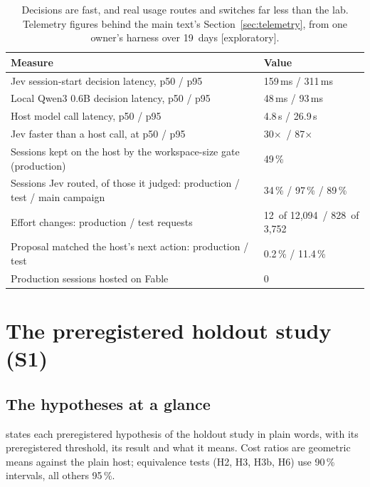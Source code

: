 \documentclass[11pt,letterpaper]{article}
\newcommand{\expl}{\mbox{\textsf{\small\color{okgray}[exploratory]}}}
\newcommand{\X}{\ensuremath{\times}}
\newcommand{\AoFableJevRoute}{89}
\newcommand{\ObDays}{19}
\newcommand{\ObEffReqProd}{12{,}094}
\newcommand{\ObEffReqTest}{3{,}752}
\newcommand{\ObEffSwitchProd}{12}
\newcommand{\ObEffSwitchTest}{828}
\newcommand{\ObFableProdSessions}{0}
\newcommand{\ObHostPfifty}{4.8}
\newcommand{\ObHostPninetyfive}{26.9}
\newcommand{\ObJevHostXFifty}{30}
\newcommand{\ObJevHostXNinetyfive}{87}
\newcommand{\ObJevPfifty}{159}
\newcommand{\ObJevPninetyfive}{311}
\newcommand{\ObJevRouteProd}{34}
\newcommand{\ObJevRouteTest}{97}
\newcommand{\ObProdRate}{0.2}
\newcommand{\ObQwenPfifty}{48}
\newcommand{\ObQwenPninetyfive}{93}
\newcommand{\ObStScopePct}{49}
\newcommand{\ObTestRate}{11.4}
\newcommand{\mainpaper}{the main text}\newcommand{\thissupp}{these appendices}\newcommand{\Thissupp}{These appendices}
\begin{document}
\begin{table}[tbp]
\centering\small
\caption{Decisions are fast, and real usage routes and switches far less than the lab. Telemetry figures behind \mainpaper{}'s
Section~\ref{sec:telemetry}, from one owner's harness over \ObDays\ days \expl.}
\label{tab:telemetrynums}
\begin{tabular*}{\textwidth}{@{\extracolsep{\fill}}l l@{}}
\toprule
Measure & Value \\
\midrule
Jev session-start decision latency, p50 / p95 & \ObJevPfifty\,ms / \ObJevPninetyfive\,ms \\
Local Qwen3 0.6B decision latency, p50 / p95 & \ObQwenPfifty\,ms / \ObQwenPninetyfive\,ms \\
Host model call latency, p50 / p95 & \ObHostPfifty\,s / \ObHostPninetyfive\,s \\
Jev faster than a host call, at p50 / p95 & \ObJevHostXFifty\X\ / \ObJevHostXNinetyfive\X \\
Sessions kept on the host by the workspace-size gate (production) & \ObStScopePct\,\% \\
Sessions Jev routed, of those it judged: production / test / main campaign & \ObJevRouteProd\,\% / \ObJevRouteTest\,\% / \AoFableJevRoute\,\% \\
Effort changes: production / test requests & \ObEffSwitchProd\ of \ObEffReqProd\ / \ObEffSwitchTest\ of \ObEffReqTest \\
Proposal matched the host's next action: production / test & \ObProdRate\,\% / \ObTestRate\,\% \\
Production sessions hosted on Fable & \ObFableProdSessions \\
\bottomrule
\end{tabular*}
\end{table}
\section{The preregistered holdout study (S1)}\label{sec:g}
\suppressfloats[t]

\subsection{The hypotheses at a glance}\label{sec:ghyp}

 states each preregistered hypothesis of the holdout study in plain words, with its preregistered
threshold, its result and what it means. Cost ratios are geometric means against the plain host; equivalence tests
(H2, H3, H3b, H6) use 90\,\% intervals, all others 95\,\%.
\end{document}

